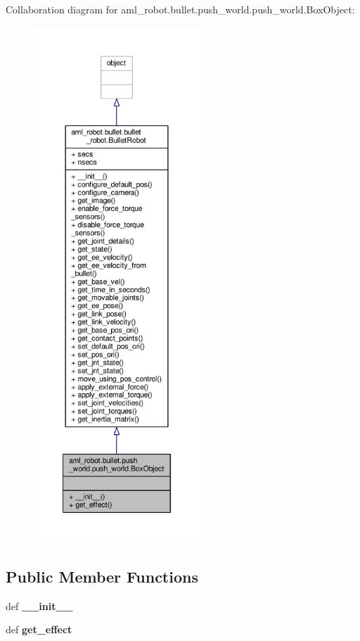 Collaboration diagram for aml\-\_\-robot.\-bullet.\-push\-\_\-world.\-push\-\_\-world.\-Box\-Object\-:
\nopagebreak
\begin{figure}[H]
\begin{center}
\leavevmode
\includegraphics[height=550pt]{classaml__robot_1_1bullet_1_1push__world_1_1push__world_1_1_box_object__coll__graph}
\end{center}
\end{figure}
\subsection*{Public Member Functions}
\begin{DoxyCompactItemize}
\item 
\hypertarget{classaml__robot_1_1bullet_1_1push__world_1_1push__world_1_1_box_object_a56b5453d71cae48208e50ff49a555d7a}{def {\bfseries \-\_\-\-\_\-init\-\_\-\-\_\-}}\label{classaml__robot_1_1bullet_1_1push__world_1_1push__world_1_1_box_object_a56b5453d71cae48208e50ff49a555d7a}

\item 
\hypertarget{classaml__robot_1_1bullet_1_1push__world_1_1push__world_1_1_box_object_a8288813cc6065a361e6507c9540ed268}{def {\bfseries get\-\_\-effect}}\label{classaml__robot_1_1bullet_1_1push__world_1_1push__world_1_1_box_object_a8288813cc6065a361e6507c9540ed268}

\end{DoxyCompactItemize}
